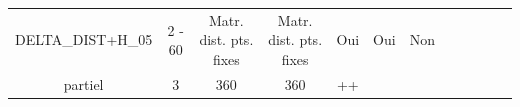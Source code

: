\begin{landscape}
\begin{tabular}{|c|c|c|c|c|c|c|c|c|c|c|c|}
\begin{minipage}{3.5cm}\vspace{1cm}DELTA\_DIST+H\_05 \vspace{5mm} \end{minipage} &
\begin{minipage}{1.3cm}2 - 60 \end{minipage} &
\begin{minipage}{1.8cm}Matr. dist. pts. fixes \end{minipage} &
\begin{minipage}{1.8cm}Matr. dist. pts. fixes \end{minipage} &
\begin{minipage}{1.4cm}Oui \end{minipage} &
\begin{minipage}{1.4cm}Oui \end{minipage} &
\begin{minipage}{2cm} Non \end{minipage} &
\begin{minipage}{1.8cm}RMSE\\ partiel \end{minipage}&
\begin{minipage}{1.65cm} 3 \end{minipage}&
\begin{minipage}{1.2cm} 360 \end{minipage} &
\begin{minipage}{1cm} 360 \end{minipage} &
\begin{minipage}{0.9cm}++ \end{minipage} \\  \hline


\end{tabular}

\end{landscape}